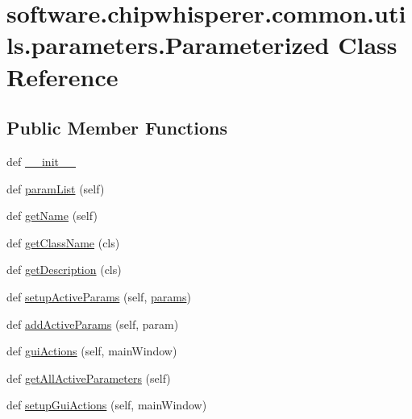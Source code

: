 \hypertarget{classsoftware_1_1chipwhisperer_1_1common_1_1utils_1_1parameters_1_1Parameterized}{}\section{software.\+chipwhisperer.\+common.\+utils.\+parameters.\+Parameterized Class Reference}
\label{classsoftware_1_1chipwhisperer_1_1common_1_1utils_1_1parameters_1_1Parameterized}
\subsection*{Public Member Functions}
\begin{DoxyCompactItemize}
\item 
def \hyperlink{classsoftware_1_1chipwhisperer_1_1common_1_1utils_1_1parameters_1_1Parameterized_a97793c584f04e1c425d857fb12b5a1e9}{\+\_\+\+\_\+init\+\_\+\+\_\+}
\item 
def \hyperlink{classsoftware_1_1chipwhisperer_1_1common_1_1utils_1_1parameters_1_1Parameterized_a1e502f3cc8d976ac2941a6f6679d1b12}{param\+List} (self)
\item 
def \hyperlink{classsoftware_1_1chipwhisperer_1_1common_1_1utils_1_1parameters_1_1Parameterized_aeccedaa63c76d2cb29479e2452ceda15}{get\+Name} (self)
\item 
def \hyperlink{classsoftware_1_1chipwhisperer_1_1common_1_1utils_1_1parameters_1_1Parameterized_ad5870ae042d20e2db63d9b4168bed3f5}{get\+Class\+Name} (cls)
\item 
def \hyperlink{classsoftware_1_1chipwhisperer_1_1common_1_1utils_1_1parameters_1_1Parameterized_a08d4c450f4f9c798e889141f33a816f1}{get\+Description} (cls)
\item 
def \hyperlink{classsoftware_1_1chipwhisperer_1_1common_1_1utils_1_1parameters_1_1Parameterized_a360a61b56144a0a90d40094e89884863}{setup\+Active\+Params} (self, \hyperlink{classsoftware_1_1chipwhisperer_1_1common_1_1utils_1_1parameters_1_1Parameterized_a4e79c2f229cc9b366e4d4aa2f584c990}{params})
\item 
def \hyperlink{classsoftware_1_1chipwhisperer_1_1common_1_1utils_1_1parameters_1_1Parameterized_a832d363261031270401d12d7dd2937a6}{add\+Active\+Params} (self, param)
\item 
def \hyperlink{classsoftware_1_1chipwhisperer_1_1common_1_1utils_1_1parameters_1_1Parameterized_a90bb432ffce1138681f9680cbe2144ba}{gui\+Actions} (self, main\+Window)
\item 
def \hyperlink{classsoftware_1_1chipwhisperer_1_1common_1_1utils_1_1parameters_1_1Parameterized_ac25f5d6b8c945c822006ecf5a1f1ca83}{get\+All\+Active\+Parameters} (self)
\item 
def \hyperlink{classsoftware_1_1chipwhisperer_1_1common_1_1utils_1_1parameters_1_1Parameterized_a28a135018e23515df57b78ac29279959}{setup\+Gui\+Actions} (self, main\+Window)
\end{DoxyCompactItemize}
